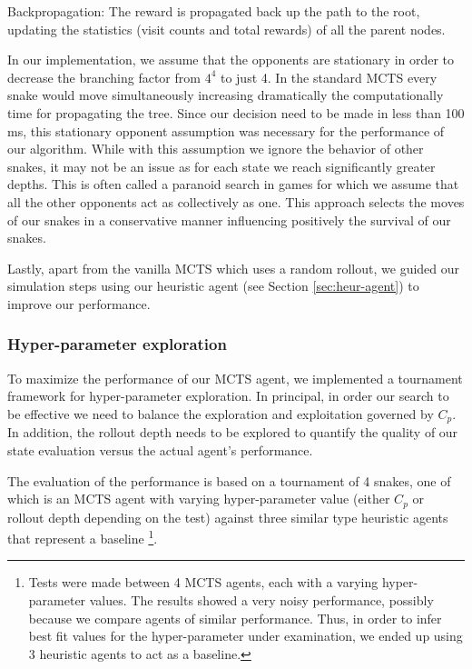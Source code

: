 \documentclass[12pt,a4paper]{article}
\begin{document}
Backpropagation: The reward is propagated back up the path to the root, updating the statistics (visit counts and total rewards) of all the parent nodes.

In our implementation, we assume that the opponents are stationary in order to decrease the branching factor from $4^4$ to just 4. In the standard MCTS every snake would move simultaneously increasing dramatically the computationally time for propagating the tree. Since our decision need to be made in less than 100 ms, this stationary opponent assumption was necessary for the performance of our algorithm. While with this assumption we ignore the behavior of other snakes, it may not be an issue as for each state we reach significantly greater depths. This is often called a paranoid search in games for which we assume that all the other opponents act as collectively as one. This approach selects the moves of our snakes in a conservative manner influencing positively the survival of our snakes. 


Lastly, apart from the vanilla MCTS which uses a random rollout, we guided our simulation steps using our heuristic agent (see Section \ref{sec:heur-agent}) to improve our performance. 

\subsubsection{Hyper-parameter exploration}\label{sec:hyperparameter-exploration}

To maximize the performance of our MCTS agent, we implemented a tournament framework for hyper-parameter exploration. In principal, in order our search to be effective we need to balance the exploration and exploitation governed by $C_p$. In addition, the rollout depth needs to be explored to quantify the quality of our state evaluation versus the actual agent's performance. 

The evaluation of the performance is based on a tournament of 4 snakes, one of which is an MCTS agent with varying hyper-parameter value (either $C_p$ or rollout depth depending on the test) against three similar type heuristic agents that represent a baseline \footnote{Tests were made between 4 MCTS agents, each with a varying hyper-parameter values. The results showed a very noisy performance, possibly because we compare agents of similar performance. Thus, in order to infer best fit values for the hyper-parameter under examination, we ended up using 3 heuristic agents to act as a baseline.}. 
\end{document}
